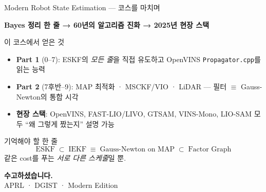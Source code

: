\begin{frame}{Modern Robot State Estimation — 코스를 마치며}
  \begin{center}
    \large
    \textbf{Bayes 정리 한 줄 → 60년의 알고리즘 진화 → 2025년 현장 스택}
  \end{center}
  \vspace{0.4em}
  \begin{block}{이 코스에서 얻은 것}
    \begin{itemize}\footnotesize
      \item \textbf{Part 1} (0--7): ESKF의 \emph{모든 줄}을 직접 유도하고 OpenVINS \texttt{Propagator.cpp}를 읽는 능력
      \item \textbf{Part 2} (7후반--9): MAP 최적화 · MSCKF/VIO · LiDAR — 필터 $\equiv$ Gauss-Newton의 통합 시각
      \item \textbf{현장 스택}: OpenVINS, FAST-LIO/LIVO, GTSAM, VINS-Mono, LIO-SAM 모두 ``왜 그렇게 짰는지'' 설명 가능
    \end{itemize}
  \end{block}
  \pause
  \vspace{0.3em}
  \begin{alertblock}{기억해야 할 한 줄}
    \[
      \boxed{\;
        \text{ESKF}\;\subset\;\text{IEKF}\;\equiv\;\text{Gauss-Newton on MAP}\;\subset\;\text{Factor Graph}
      \;}
    \]
    같은 cost를 푸는 \emph{서로 다른 스케줄}일 뿐.
  \end{alertblock}
  \vspace{0.4em}
  \begin{center}
    {\large \textbf{수고하셨습니다.}}\\[0.2em]
    \scriptsize APRL · DGIST · Modern Edition
  \end{center}
\end{frame}


